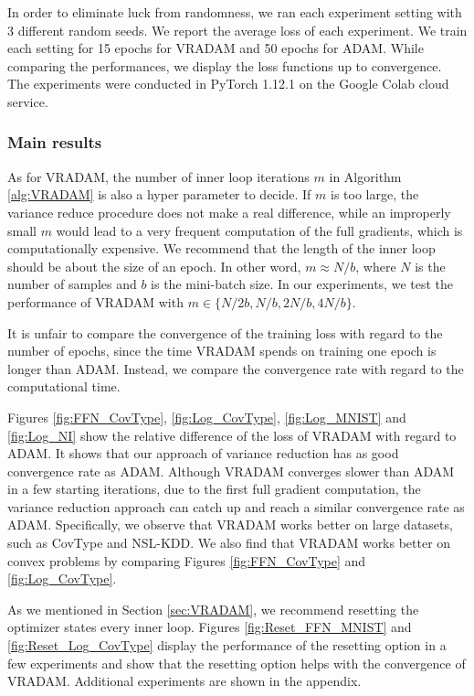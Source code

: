 \documentclass[twoside]{article}
\begin{document}
In order to eliminate luck from randomness, we ran each experiment setting with 3 different random seeds. We report the average loss of each experiment. We train each setting for 15 epochs for VRADAM and 50 epochs for ADAM. While comparing the performances, we display the loss functions up to convergence. The experiments were conducted in PyTorch 1.12.1 on the Google Colab cloud service.
\subsubsection{Main results}
As for VRADAM, the number of inner loop iterations $m$ in Algorithm \ref{alg:VRADAM} is also a hyper parameter to decide. If $m$ is too large, the variance reduce procedure does not make a real difference, while an improperly small $m$ would lead to a very frequent computation of the full gradients, which is computationally expensive. We recommend that the length of the inner loop should be about the size of an epoch. In other word, $m \approx N/b$, where $N$ is the number of samples and $b$ is the mini-batch size. In our experiments, we test the performance of VRADAM with $m \in \{N/2b, N/b, 2N/b, 4N/b\}$.

It is unfair to compare the convergence of the training loss with regard to the number of epochs, since the time VRADAM spends on training one epoch is longer than ADAM. Instead, we compare the convergence rate with regard to the computational time. 

Figures \ref{fig:FFN_CovType}, \ref{fig:Log_CovType}, \ref{fig:Log_MNIST} and \ref{fig:Log_NI} show the relative difference of the loss of VRADAM with regard to ADAM. It shows that our approach of variance reduction has as good convergence rate as ADAM. Although VRADAM converges slower than ADAM in a few starting iterations, due to the first full gradient computation, the variance reduction approach can catch up and reach a similar convergence rate as ADAM. Specifically, we observe that VRADAM works better on large datasets, such as CovType and NSL-KDD. We also find that VRADAM works better on convex  problems by comparing Figures \ref{fig:FFN_CovType} and \ref{fig:Log_CovType}.

As we mentioned in Section \ref{sec:VRADAM}, we recommend resetting the optimizer states every inner loop. Figures \ref{fig:Reset_FFN_MNIST} and \ref{fig:Reset_Log_CovType} display the performance of the resetting option in a few experiments and show that the resetting option helps with the convergence of VRADAM. Additional experiments are shown in the appendix.
\end{document}
